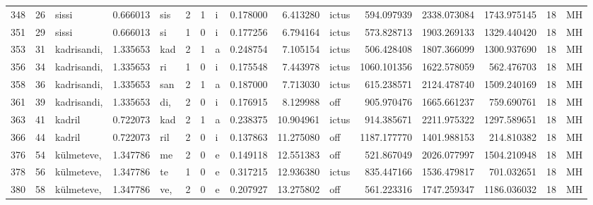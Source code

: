 \begin{tabular}{lrlrllllrrlrrrll}
348  &          26 &            sissi &  0.666013 &     sis &        2 &      1 &       i &      0.178000 &      6.413280 &  ictus &   594.097939 &  2338.073084 &  1743.975145 &     18 &        MH \\
351  &          29 &            sissi &  0.666013 &      si &        1 &      0 &       i &      0.177256 &      6.794164 &  ictus &   573.828713 &  1903.269133 &  1329.440420 &     18 &        MH \\
353  &          31 &      kadrisandi, &  1.335653 &     kad &        2 &      1 &       a &      0.248754 &      7.105154 &  ictus &   506.428408 &  1807.366099 &  1300.937690 &     18 &        MH \\
356  &          34 &      kadrisandi, &  1.335653 &      ri &        1 &      0 &       i &      0.175548 &      7.443978 &  ictus &  1060.101356 &  1622.578059 &   562.476703 &     18 &        MH \\
358  &          36 &      kadrisandi, &  1.335653 &     san &        2 &      1 &       a &      0.187000 &      7.713030 &  ictus &   615.238571 &  2124.478740 &  1509.240169 &     18 &        MH \\
361  &          39 &      kadrisandi, &  1.335653 &     di, &        2 &      0 &       i &      0.176915 &      8.129988 &    off &   905.970476 &  1665.661237 &   759.690761 &     18 &        MH \\
363  &          41 &           kadril &  0.722073 &     kad &        2 &      1 &       a &      0.238375 &     10.904961 &  ictus &   914.385671 &  2211.975322 &  1297.589651 &     18 &        MH \\
366  &          44 &           kadril &  0.722073 &     ril &        2 &      0 &       i &      0.137863 &     11.275080 &    off &  1187.177770 &  1401.988153 &   214.810382 &     18 &        MH \\
376  &          54 &       külmeteve, &  1.347786 &      me &        2 &      0 &       e &      0.149118 &     12.551383 &    off &   521.867049 &  2026.077997 &  1504.210948 &     18 &        MH \\
378  &          56 &       külmeteve, &  1.347786 &      te &        1 &      0 &       e &      0.317215 &     12.936380 &  ictus &   835.447166 &  1536.479817 &   701.032651 &     18 &        MH \\
380  &          58 &       külmeteve, &  1.347786 &     ve, &        2 &      0 &       e &      0.207927 &     13.275802 &    off &   561.223316 &  1747.259347 &  1186.036032 &     18 &        MH \\

\end{tabular}
